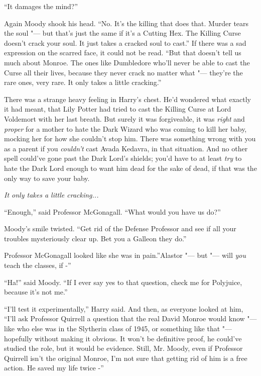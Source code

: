 ``It damages the mind?''

Again Moody shook his head. ``No. It's the killing that does that.
Murder tears the soul "--- but that's just the same if it's a Cutting Hex.
The Killing Curse doesn't crack your soul. It just takes a cracked soul
to cast.'' If there was a sad expression on the scarred face, it could
not be read. ``But that doesn't tell us much about Monroe. The ones like
Dumbledore who'll never be able to cast the Curse all their lives,
because they never crack no matter what "--- they're the rare ones, very
rare. It only takes a little cracking.''

There was a strange heavy feeling in Harry's chest. He'd wondered what
exactly it had meant, that Lily Potter had tried to cast the Killing
Curse at Lord Voldemort with her last breath. But surely it was
forgiveable, it was \emph{right} and \emph{proper} for a mother to hate
the Dark Wizard who was coming to kill her baby, mocking her for how she
couldn't stop him. There was something wrong with you as a parent if you
\emph{couldn't} cast Avada Kedavra, in that situation. And no other
spell could've gone past the Dark Lord's shields; you'd have to at least
\emph{try} to hate the Dark Lord enough to want him dead for the sake of
dead, if that was the only way to save your baby.

\emph{It only takes a little cracking...}

``Enough,'' said Professor McGonagall. ``What would you have us do?''

Moody's smile twisted. ``Get rid of the Defense Professor and see if all
your troubles mysteriously clear up. Bet you a Galleon they do.''

Professor McGonagall looked like she was in pain.''Alastor "--- but "--- will
\emph{you} teach the classes, if -''

``Ha!'' said Moody. ``If I ever say yes to that question, check me for
Polyjuice, because it's not me.''

``I'll test it experimentally,'' Harry said. And then, as everyone
looked at him, ``I'll ask Professor Quirrell a question that the real
David Monroe would know "--- like who else was in the Slytherin class of
1945, or something like that "--- hopefully without making it obvious. It
won't be definitive proof, he could've studied the role, but it would be
evidence. Still, Mr. Moody, even if Professor Quirrell isn't the
original Monroe, I'm not sure that getting rid of him is a free action.
He saved my life twice -''

